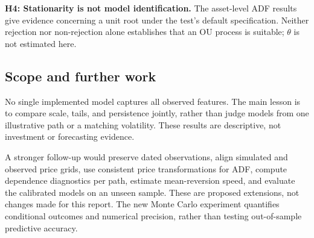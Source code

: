\documentclass[11pt,a4paper]{article}
\begin{document}
\textbf{H4: Stationarity is not model identification.} The asset-level
ADF results give evidence concerning a unit root under the test's default
specification. Neither rejection nor non-rejection alone establishes
that an OU process is suitable; $\theta$ is not estimated here.

\subsection{Scope and further work}
No single implemented model captures all observed features. The main
lesson is to compare scale, tails, and persistence jointly, rather than
judge models from one illustrative path or a matching volatility.
These results are descriptive, not investment or forecasting evidence.

A stronger follow-up would preserve dated observations, align simulated
and observed price grids, use consistent price transformations for ADF,
compute dependence diagnostics per path, estimate mean-reversion speed,
and evaluate the calibrated models on an unseen sample. These are
proposed extensions, not changes made for this report. The new Monte Carlo
experiment quantifies conditional outcomes and numerical precision, rather
than testing out-of-sample predictive accuracy.
\end{document}
